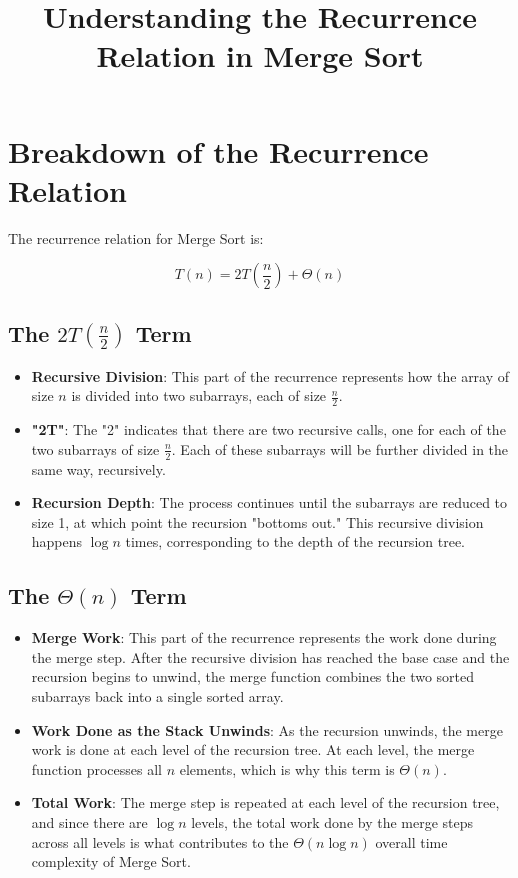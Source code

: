\documentclass{article}
\title{Understanding the Recurrence Relation in Merge Sort}
\author{}
\date{}
\begin{document}
\maketitle

\section{Breakdown of the Recurrence Relation}

The recurrence relation for Merge Sort is:

\[
T(n) = 2T\left(\frac{n}{2}\right) + \Theta(n)
\]

\subsection{The \( 2T\left(\frac{n}{2}\right) \) Term}

\begin{itemize}
    \item \textbf{Recursive Division}: This part of the recurrence represents how the array of size \( n \) is divided into two subarrays, each of size \( \frac{n}{2} \).
    
    \item \textbf{"2T"}: The "2" indicates that there are two recursive calls, one for each of the two subarrays of size \( \frac{n}{2} \). Each of these subarrays will be further divided in the same way, recursively.
    
    \item \textbf{Recursion Depth}: The process continues until the subarrays are reduced to size 1, at which point the recursion "bottoms out." This recursive division happens \( \log n \) times, corresponding to the depth of the recursion tree.
\end{itemize}

\subsection{The \( \Theta(n) \) Term}

\begin{itemize}
    \item \textbf{Merge Work}: This part of the recurrence represents the work done during the merge step. After the recursive division has reached the base case and the recursion begins to unwind, the merge function combines the two sorted subarrays back into a single sorted array.
    
    \item \textbf{Work Done as the Stack Unwinds}: As the recursion unwinds, the merge work is done at each level of the recursion tree. At each level, the merge function processes all \( n \) elements, which is why this term is \( \Theta(n) \).
    
    \item \textbf{Total Work}: The merge step is repeated at each level of the recursion tree, and since there are \( \log n \) levels, the total work done by the merge steps across all levels is what contributes to the \( \Theta(n \log n) \) overall time complexity of Merge Sort.
\end{itemize}
\end{document}
